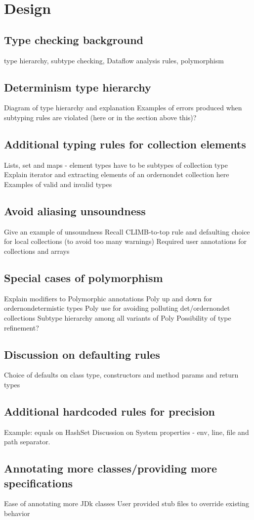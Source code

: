 \section{Design}
\subsection{Type checking background}
type hierarchy, subtype checking, Dataflow analysis rules, polymorphism

\subsection{Determinism type hierarchy}
Diagram of type hierarchy and explanation
Examples of errors produced when subtyping rules are violated (here or in the section above this)?

\subsection{Additional typing rules for collection elements}
Lists, set and maps - element types have to be subtypes of collection type 
Explain iterator and extracting elements of an ordernondet collection here
Examples of valid and invalid types

\subsection{Avoid aliasing unsoundness}
Give an example of unsoundness 
Recall CLIMB-to-top rule and defaulting choice for local collections (to avoid too many warnings)
Required user annotations for collections and arrays

\subsection{Special cases of polymorphism}
Explain modifiers to Polymorphic annotations
Poly up and down for ordernondetermistic types
Poly use for avoiding polluting det/ordernondet collections
Subtype hierarchy among all variants of Poly
Possibility of type refinement?	

\subsection{Discussion on defaulting rules}
Choice of defaults on class type, constructors and method params and return types

\subsection{Additional hardcoded rules for precision}
Example: equals on HashSet
Discussion on System properties - env, line, file and path separator.

\subsection{Annotating more classes/providing more specifications}
Ease of annotating more JDk classes
User provided stub files to override existing behavior
